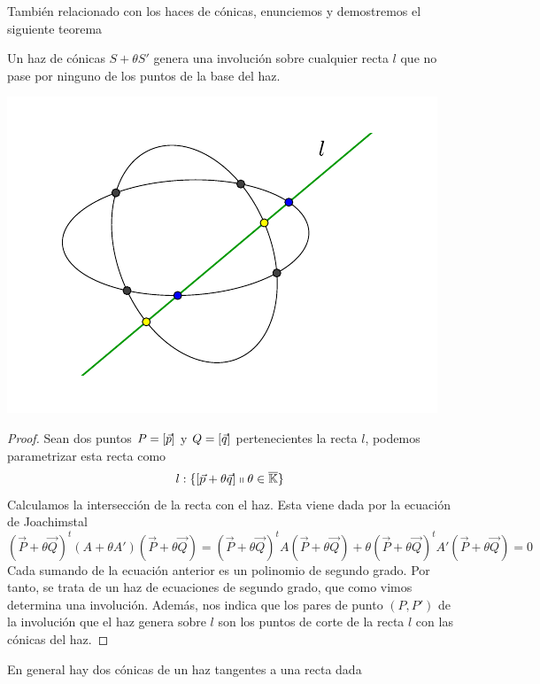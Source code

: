 También relacionado con los haces de cónicas, enunciemos y demostremos el siguiente teorema

\begin{theo}
	Un haz de cónicas $S+\theta S'$ genera una involución sobre cualquier recta $l$ que no pase por ninguno de los puntos de la base del haz.
	\begin{center}
		\includegraphics[scale=.9]{Graficos/Conicas/TeoremaDesargues}
	\end{center}
\end{theo}
\begin{proof}
	Sean dos puntos $P=\left [ \vec{p} \right ]$ y $Q=\left [ \vec{q} \right ]$ pertenecientes la recta $l$, podemos parametrizar esta recta como
	\[l:\{\left [ \vec{p}+\theta\vec{q} \right ]\shortparallel\theta\in\overline{\mathbb{K}}\}\]
	Calculamos la intersección de la recta con el haz. Esta viene dada por la ecuación de Joachimstal
	\begin{equation*}
		(\vec{P}+\theta \vec{Q})^t(A+\theta A')(\vec{P}+\theta \vec{Q})=(\vec{P}+\theta \vec{Q})^tA(\vec{P}+\theta \vec{Q})+\theta(\vec{P}+\theta \vec{Q})^tA'(\vec{P}+\theta \vec{Q})=0
	\end{equation*}
	Cada sumando de la ecuación anterior es un polinomio de segundo grado. Por tanto, se trata de un haz de ecuaciones de segundo grado, que como vimos determina una involución. Además, nos indica que los pares de punto $(P,P')$ de la involución que el haz genera sobre $l$ son los puntos de corte de la recta $l$ con las cónicas del haz.
\end{proof}
\begin{cor}
	En general hay dos cónicas de un haz tangentes a una recta dada
\end{cor}
